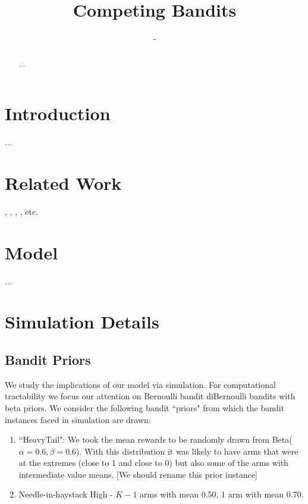 \documentclass{article}
\title{Competing Bandits}
\author{-}
\theoremstyle{definition}
\begin{document}
\maketitle

\begin{abstract}
...
\end{abstract}

\section{Introduction}
\label{S:1}

...

\section{Related Work}
\label{S:2}

\citealt*{mansour2017competing}, \citealt*{che2017recommender}, \citealt*{kremer2014implementing}, \citealt*{mansour2015bayesian}, etc.

\section{Model}
\label{S:3}

...

\section{Simulation Details}
\label{S:4}

\subsection{Bandit Priors}
We study the implications of our model via simulation. For computational tractability we focus our attention on Bernoulli bandit diBernoulli bandits with beta priors. We consider the following bandit ``priors" from which the bandit instances faced in simulation are drawn:
\begin{enumerate}
\item ``HeavyTail": We took the mean rewards to be randomly drawn from Beta($\alpha=0.6,\beta=0.6$). With this distribution it was likely to have arms that were at the extremes (close to 1 and close to 0) but also some of the arms with intermediate value means. [We should rename this prior instance]
\item Needle-in-haystack High - $K-1$ arms with mean 0.50, 1 arm with mean 0.70. 
\end{enumerate}
\end{document}
